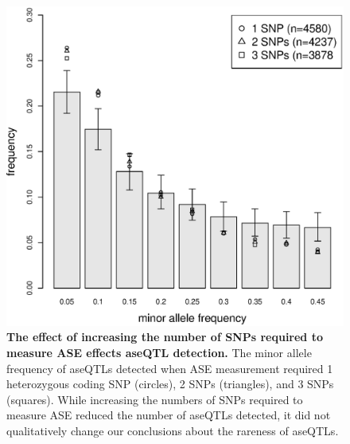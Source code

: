 \begin{figure}[h!]
      \centering
       \includegraphics[width=\linewidth]{Ch3FigS8}
    \caption{\textbf{The effect of increasing the number of SNPs required to measure ASE effects aseQTL detection.} The minor allele frequency of aseQTLs detected when ASE measurement required 1 heterozygous coding SNP (circles), 2 SNPs (triangles), and 3 SNPs (squares). While increasing the numbers of SNPs required to measure ASE reduced the number of aseQTLs detected, it did not qualitatively change our conclusions about the rareness of aseQTLs.}
    \label{fig:3figS8}
\end{figure}

